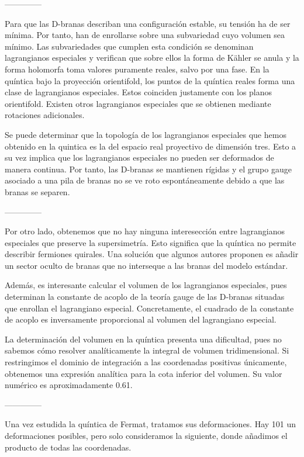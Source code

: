 \documentclass[oneside,secnumarabic,10pt,nobalancelastpage,nofootinbib,a4paper]{article}
\begin{document}
--------------

Para que las D-branas describan una configuración estable, su tensión ha de ser mínima. 
Por tanto, han de enrollarse sobre una subvariedad cuyo volumen sea mínimo. 
Las subvariedades que cumplen esta condición se denominan lagrangianos especiales y 
verifican que sobre ellos la forma de Kähler se anula y la forma holomorfa toma valores puramente reales, salvo por una fase.
En la quíntica bajo la proyección orientifold, los puntos de la quíntica reales forma una clase de lagrangianos especiales.
Estos coinciden justamente con los planos orientifold.
Existen otros lagrangianos especiales que se obtienen mediante rotaciones adicionales.

Se puede determinar que la topología de los lagrangianos especiales que hemos obtenido en la quintica es la del espacio real proyectivo de dimensión
tres. Esto a su vez implica que los lagrangianos especiales no pueden ser deformados de manera continua. 
Por tanto, las D-branas se mantienen rígidas y el grupo gauge asociado a una pila de branas no se ve roto espontáneamente debido a que las 
branas se separen.

--------------

Por otro lado, obtenemos que no hay ninguna interesección entre lagrangianos especiales que preserve la supersimetría.
Esto significa que la quíntica no permite describir fermiones quirales. 
Una solución que algunos autores proponen es añadir un sector oculto de branas que no interseque a las branas del modelo estándar.

Además, es interesante calcular el volumen de los lagrangianos especiales, pues determinan la constante de acoplo de la 
teoría gauge de las D-branas situadas que enrollan el lagrangiano especial. Concretamente, el cuadrado de la constante de acoplo
es inversamente proporcional al volumen del lagrangiano especial.

La determinación del volumen en la quíntica presenta una dificultad, pues no sabemos cómo resolver analíticamente la integral de volumen tridimensional.
Si restringimos el dominio de integración a las coordenadas positivas únicamente, obtenemos una expresión analítica para la cota inferior 
del volumen. Su valor numérico es aproximadamente 0.61.

--------------

Una vez estudida la quíntica de Fermat, tratamos sus deformaciones.
Hay 101 un deformaciones posibles, pero solo consideramos la siguiente, donde añadimos el producto de todas las coordenadas.
\end{document}
